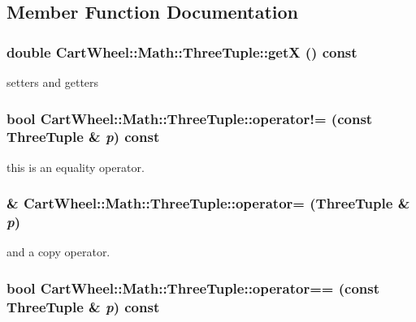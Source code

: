 \subsection{Member Function Documentation}
\hypertarget{classCartWheel_1_1Math_1_1ThreeTuple_af23915ba2673d2afc2a0b51449576529}{
\subsubsection[{getX}]{\setlength{\rightskip}{0pt plus 5cm}double CartWheel::Math::ThreeTuple::getX () const}}
\label{classCartWheel_1_1Math_1_1ThreeTuple_af23915ba2673d2afc2a0b51449576529}
setters and getters \hypertarget{classCartWheel_1_1Math_1_1ThreeTuple_a1079126eb3c4dbe3ad019d918b62614b}{
\subsubsection[{operator!=}]{\setlength{\rightskip}{0pt plus 5cm}bool CartWheel::Math::ThreeTuple::operator!= (const {\bf ThreeTuple} \& {\em p}) const}}
\label{classCartWheel_1_1Math_1_1ThreeTuple_a1079126eb3c4dbe3ad019d918b62614b}
this is an equality operator. \hypertarget{classCartWheel_1_1Math_1_1ThreeTuple_a068cfb8297eae8bb4038301e8084e4c2}{
\subsubsection[{operator=}]{\& CartWheel::Math::ThreeTuple::operator= ({\bf ThreeTuple} \& {\em p})}}
\label{classCartWheel_1_1Math_1_1ThreeTuple_a068cfb8297eae8bb4038301e8084e4c2}
and a copy operator. \hypertarget{classCartWheel_1_1Math_1_1ThreeTuple_a2a8a513c11d07504ad63172d9229f7b2}{
\subsubsection[{operator==}]{\setlength{\rightskip}{0pt plus 5cm}bool CartWheel::Math::ThreeTuple::operator== (const {\bf ThreeTuple} \& {\em p}) const}}
